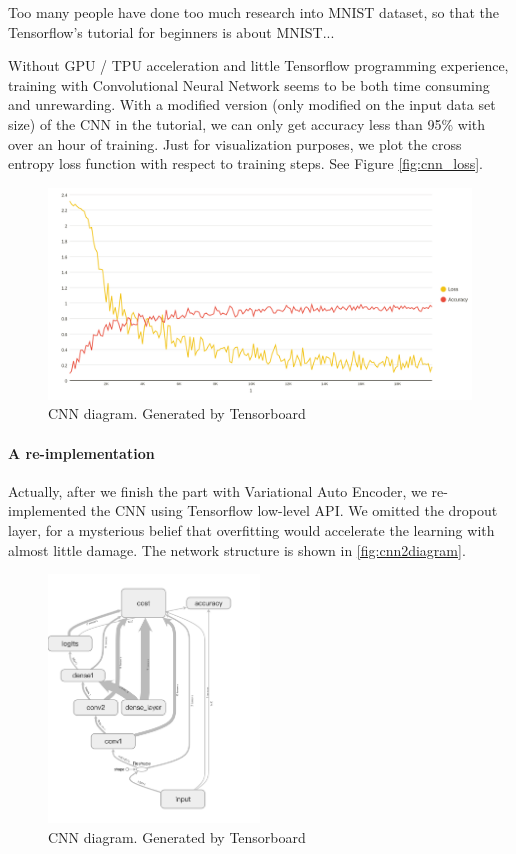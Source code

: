 \documentclass[a4paper,10pt,UTF8]{article}
\numberwithin{equation}{section}
\numberwithin{figure}{section}
\begin{document}
Too many people have done too much research into MNIST dataset, so that the Tensorflow's tutorial for beginners is about MNIST...

Without GPU / TPU acceleration and little Tensorflow programming experience, training with Convolutional Neural Network seems to be both time consuming and unrewarding. With a modified version (only modified on the input data set size) of the CNN in the tutorial, we can only get accuracy less than 95\% with over an hour of training. Just for visualization purposes, we plot the cross entropy loss function with respect to training steps. See Figure \autoref{fig:cnn_loss}.

\begin{figure}[htbp]
\centering
\includegraphics[width=1.0\textwidth]{img/cnn_loss.png}
\caption{CNN diagram. Generated by Tensorboard}
\label{fig:cnn_loss}
\end{figure}

\paragraph{A re-implementation} Actually, after we finish the part with Variational Auto Encoder, we re-implemented the CNN using Tensorflow low-level API. We omitted the dropout layer, for a mysterious belief that overfitting would accelerate the learning with almost little damage. The network structure is shown in \autoref{fig:cnn2diagram}.

\begin{figure}[htbp]
\centering
\includegraphics[width=0.5\textwidth]{img/cnn1.png}
\caption{CNN diagram. Generated by Tensorboard}
\label{fig:cnn2diagram}
\end{figure}
\end{document}
